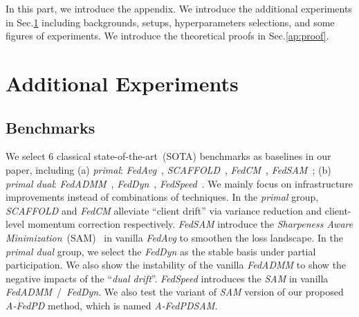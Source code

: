 \newpage
\appendix
\onecolumn

In this part, we introduce the appendix. We introduce the additional experiments in Sec.\ref{ap:exp} including backgrounds, setups, hyperparameters selections, and some figures of experiments. We introduce the theoretical proofs in Sec.\ref{ap:proof}.


\section{Additional Experiments}
\label{ap:exp}
\subsection{Benchmarks}
\label{ap:fedpdsam}
We select 6 classical state-of-the-art~(SOTA) benchmarks as baselines in our paper, including (a) \textit{primal}: \textit{FedAvg}~\cite{mcmahan2017communication}, \textit{SCAFFOLD}~\cite{karimireddy2020scaffold}, \textit{FedCM}~\cite{xu2021fedcm}, \textit{FedSAM}~\cite{qu2022generalized}; (b) \textit{primal dual}: \textit{FedADMM}~\cite{wang2022fedadmm}, \textit{FedDyn}~\cite{wang2022fedadmm}, \textit{FedSpeed}~\cite{sun2023fedspeed}. We mainly focus on infrastructure improvements instead of combinations of techniques. In the \textit{primal} group, \textit{SCAFFOLD} and \textit{FedCM} alleviate ``client drift'' via variance reduction and client-level momentum correction respectively. \textit{FedSAM} introduce the \textit{Sharpeness Aware Minimization}~(SAM)~\cite{foret2020sharpness} in vanilla \textit{FedAvg} to smoothen the loss landscape. In the \textit{primal dual} group, we select the \textit{FedDyn} as the stable basis under partial participation. We also show the instability of the vanilla \textit{FedADMM} to show the negative impacts of the ``\textit{dual drift}''. \textit{FedSpeed} introduces the \textit{SAM} in vanilla \textit{FedADMM}\ /\ \textit{FedDyn}. We also test the variant of \textit{SAM} version of our proposed \textit{A-FedPD} method, which is named \textit{A-FedPDSAM}.


